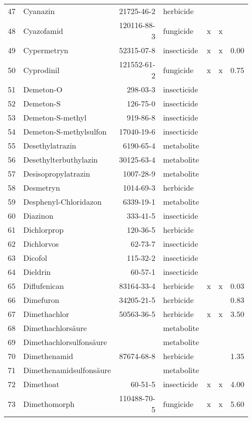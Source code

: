 \begin{longtable}{lp{3cm}rlp{0.5cm}p{0.5cm}p{1cm}}
  47 & Cyanazin & 21725-46-2 & herbicide &  &  &  \\ 
  48 & Cyazofamid & 120116-88-3 & fungicide & x & x &  \\ 
  49 & Cypermetryn & 52315-07-8 & insecticide & x & x & 0.00 \\ 
  50 & Cyprodinil & 121552-61-2 & fungicide & x & x & 0.75 \\ 
  51 & Demeton-O & 298-03-3 & insecticide &  &  &  \\ 
  52 & Demeton-S & 126-75-0 & insecticide &  &  &  \\ 
  53 & Demeton-S-methyl & 919-86-8 & insecticide &  &  &  \\ 
  54 & Demeton-S-methylsulfon & 17040-19-6 & insecticide &  &  &  \\ 
  55 & Desethylatrazin & 6190-65-4 & metabolite &  &  &  \\ 
  56 & Desethylterbuthylazin & 30125-63-4 & metabolite &  &  &  \\ 
  57 & Desisopropylatrazin & 1007-28-9 & metabolite &  &  &  \\ 
  58 & Desmetryn & 1014-69-3 & herbicide &  &  &  \\ 
  59 & Desphenyl-Chloridazon & 6339-19-1 & metabolite &  &  &  \\ 
  60 & Diazinon & 333-41-5 & insecticide &  &  &  \\ 
  61 & Dichlorprop & 120-36-5 & herbicide &  &  &  \\ 
  62 & Dichlorvos & 62-73-7 & insecticide &  &  &  \\ 
  63 & Dicofol & 115-32-2 & insecticide &  &  &  \\ 
  64 & Dieldrin & 60-57-1 & insecticide &  &  &  \\ 
  65 & Diflufenican & 83164-33-4 & herbicide & x & x & 0.03 \\ 
  66 & Dimefuron & 34205-21-5 & herbicide &  &  & 0.83 \\ 
  67 & Dimethachlor & 50563-36-5 & herbicide & x & x & 3.50 \\ 
  68 & Dimethachlorsäure &  & metabolite &  &  &  \\ 
  69 & Dimethachlorsulfonsäure &  & metabolite &  &  &  \\ 
  70 & Dimethenamid & 87674-68-8 & herbicide &  &  & 1.35 \\ 
  71 & Dimethenamidsulfonsäure &  & metabolite &  &  &  \\ 
  72 & Dimethoat & 60-51-5 & insecticide & x & x & 4.00 \\ 
  73 & Dimethomorph & 110488-70-5 & fungicide & x & x & 5.60 \\ 

\end{longtable}
